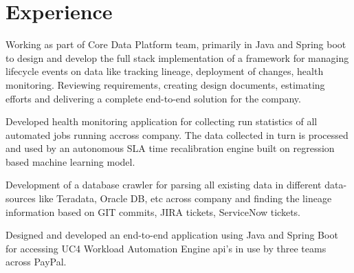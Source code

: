 \documentclass[]{kushal-resume}
\begin{document}
\hfill
\begin{minipage}[t]{0.66\textwidth}
	

\section{Experience}

\vspace{\topsep}
\begin{tightemize}\item Working as part of Core Data Platform team, primarily in Java  and Spring boot to design and develop the full stack  implementation of a  framework for managing lifecycle events on  data like tracking lineage, deployment of changes, health monitoring. 
Reviewing requirements, creating design documents, estimating efforts and delivering a complete end-to-end solution for the company. 
\item Developed health monitoring application for collecting run statistics of all automated jobs running accross company.
The data collected in turn is processed and used by an autonomous SLA time recalibration engine built on regression based machine learning model.
\item Development of a database crawler for parsing all existing data in different data-sources like Teradata, Oracle DB, etc across company and finding the lineage information based on GIT commits, JIRA tickets, ServiceNow tickets.
\item Designed and developed an end-to-end application using Java and Spring Boot for accessing UC4 Workload Automation Engine api's in use by three teams across PayPal.
\end{tightemize}
\sectionsep


\end{minipage}
\end{document}
